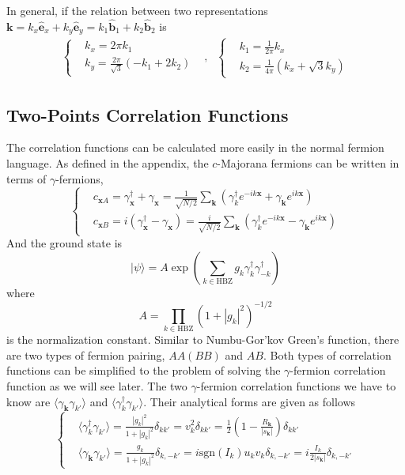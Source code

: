 \documentclass[12font]{article}
\theoremstyle{definition}
\newcommand{\ket}[1]{| #1 \rangle}
\newcommand{\anglelr}[1]{\langle #1 \rangle}
\newcommand{\lr}[1]{\left(  #1  \right)}
\newcommand{\abs}[1]{\left|  #1  \right|}
\newcommand{\mrm}[1]{\mathrm{#1}}
\newcommand{\bo}[1]{\mathbf{#1}}
\begin{document}
In general, if the relation between two representations $\bo{k} = k_x\hat{\bo{e}}_x + k_y\hat{\bo{e}}_y = k_1\hat{\bo{b}}_1 + k_2\hat{\bo{b}}_2$ is
\[
\begin{array}{ccc}
    \left\{
    \begin{aligned}
        & k_x = 2\pi k_1 \\
        & k_y = \frac{2\pi}{\sqrt{3}}\lr{-k_1 + 2k_2}
    \end{aligned}
    \right.
    &  
    ,
    &
    \left\{
    \begin{aligned}
        & k_1 = \frac{1}{2\pi} k_x \\
        & k_2 = \frac{1}{4\pi}\lr{k_x + \sqrt{3}k_y}
    \end{aligned}
    \right.
\end{array}
\]


\subsection{Two-Points Correlation Functions}
The correlation functions can be calculated more easily in the normal fermion language. As defined in the appendix, the $c$-Majorana fermions can be written in terms of $\gamma$-fermions,
\[
\left\{
\begin{aligned}
& c_{\bo{x}A} =  \gamma^\dagger_{\bo{x}} + \gamma_{\bo{x}} = \frac{1}{\sqrt{N/2}}\sum_{\bo{k}}\lr{\gamma^\dagger_k e^{-ik\bo{x}} + \gamma_{\bo{k}} e^{ik\bo{x}}} \\
& c_{\bo{x}B} = i\lr{\gamma^\dagger_{\bo{x}} - \gamma_{\bo{x}}} = \frac{i}{\sqrt{N/2}}\sum_{\bo{k}}\lr{\gamma^\dagger_k e^{-ik\bo{x}} - \gamma_{\bo{k}} e^{ik\bo{x}}}
\end{aligned}
\right.
\]
And the ground state is 
\[
\ket{\psi} = A\exp\lr{\sum_{k\in\mrm{HBZ}}g_k\gamma^\dagger_k\gamma^\dagger_{-k}}
\]
where 
\[
A = \prod_{k\in\mrm{HBZ}}\lr{1 + \abs{g_k}^2}^{-1/2}
\]
is the normalization constant. Similar to Numbu-Gor'kov Green's function, there are two types of fermion pairing, $AA(BB)$ and $AB$. Both types of correlation functions can be simplified to the problem of solving the $\gamma$-fermion correlation function as we will see later. The two $\gamma$-fermion correlation functions we have to know are $\anglelr{\gamma_{\bo{k}}\gamma_{k'}}$ and $\anglelr{\gamma^\dagger_k\gamma_{k'}}$. Their analytical forms are given as follows
\[
\left\{
\begin{aligned}
& \anglelr{\gamma^\dagger_k \gamma_{k'}} = \frac{\abs{g_k}^2}{1+\abs{g_k}^2}\delta_{kk'} = v_k^2\delta_{kk'} = \frac{1}{2}\lr{1-\frac{R_{\bo{k}}}{\abs{s_{\bo{k}}}}}\delta_{kk'}\\
& \anglelr{\gamma_{\bo{k}}\gamma_{k'}} = \frac{g_k}{1+\abs{g_k}^2}\delta_{k,-k'} = i\mrm{sgn}\lr{I_k}u_kv_k\delta_{k,-k'} = i\frac{I_k}{2\abs{s_{\bo{k}}}}\delta_{k,-k'}
\end{aligned}
\right.
\]
\end{document}
